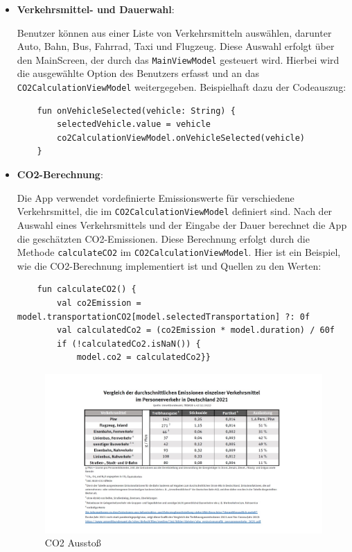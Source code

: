 \documentclass{article}
\begin{document}
\begin{itemize}
    \item \textbf{Verkehrsmittel- und Dauerwahl}:
    
    Benutzer können aus einer Liste von Verkehrsmitteln auswählen, darunter Auto, Bahn, Bus, Fahrrad, Taxi und Flugzeug. Diese Auswahl erfolgt über den MainScreen, der durch das \texttt{MainViewModel} gesteuert wird. Hierbei wird die ausgewählte Option des Benutzers erfasst und an das \texttt{CO2CalculationViewModel} weitergegeben. Beispielhaft dazu der Codeauszug:
    
    \begin{lstlisting}
    fun onVehicleSelected(vehicle: String) {
        selectedVehicle.value = vehicle
        co2CalculationViewModel.onVehicleSelected(vehicle)
    }
    \end{lstlisting}

    \item \textbf{CO2-Berechnung}:
    
    Die App verwendet vordefinierte Emissionswerte für verschiedene Verkehrsmittel, die im \texttt{CO2CalculationViewModel} definiert sind. Nach der Auswahl eines Verkehrsmittels und der Eingabe der Dauer berechnet die App die geschätzten CO2-Emissionen. Diese Berechnung erfolgt durch die Methode \texttt{calculateCO2} im \texttt{CO2CalculationViewModel}. Hier ist ein Beispiel, wie die CO2-Berechnung implementiert ist und  Quellen zu den Werten:
    
    \begin{lstlisting}
    fun calculateCO2() {
        val co2Emission = model.transportationCO2[model.selectedTransportation] ?: 0f
        val calculatedCo2 = (co2Emission * model.duration) / 60f
        if (!calculatedCo2.isNaN()) {
            model.co2 = calculatedCo2}}
    \end{lstlisting}
   
\begin{figure}
   \includegraphics[width=1.00\textwidth]{uba_emissionstabelle_personenverkehr_2021_0}
   \caption{CO2 Ausstoß}
\end{figure}


\end{itemize}
\end{document}
